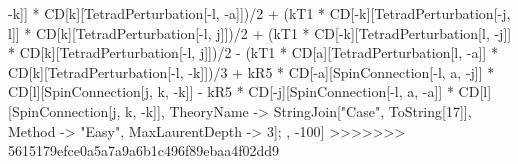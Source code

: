 -k]] * CD[k][TetradPerturbation[-l, -a]])/2 + (kT1 * CD[-k][TetradPerturbation[-j, l]] * CD[k][TetradPerturbation[-l, j]])/2 + (kT1 * CD[-k][TetradPerturbation[l, -j]] * CD[k][TetradPerturbation[-l, j]])/2 - (kT1 * CD[a][TetradPerturbation[l, -a]] * CD[k][TetradPerturbation[-l, -k]])/3 + kR5 * CD[-a][SpinConnection[-l, a, -j]] * CD[l][SpinConnection[j, k, -k]] - kR5 * CD[-j][SpinConnection[-l, a, -a]] * CD[l][SpinConnection[j, k, -k]], TheoryName -> StringJoin["Case", ToString[17]], Method -> "Easy", MaxLaurentDepth -> 3]; , -100]
>>>>>>> 5615179efce0a5a7a9a6b1c496f89ebaa4f02dd9

